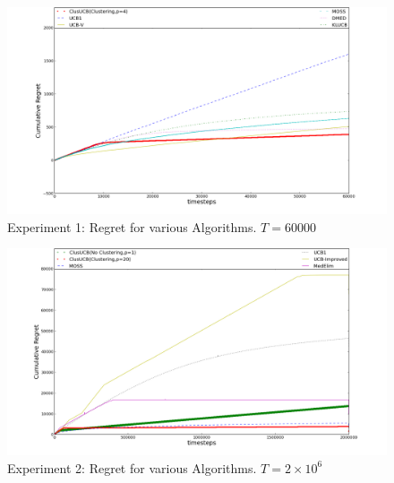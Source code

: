 




\begin{figure}[!tbp]
\label{fig:1}
\begin{minipage}[b]{0.5\textwidth}
\includegraphics[width=\textwidth]{img/ClusUCB_variousAlgo.png}

\caption{Experiment 1: Regret for various Algorithms. $T=60000$}
\end{minipage}
\end{figure}

\hspace{0.1em}

\begin{figure}[!tbp]
\label{fig:2}
\begin{minipage}[b]{0.5\textwidth}

\includegraphics[width=\textwidth]{img/clusUCB_variousAlgo(expt2)_Final.png}
\caption{Experiment 2: Regret for various Algorithms. $T=2\times 10^{6}$}
\end{minipage}
\end{figure}

